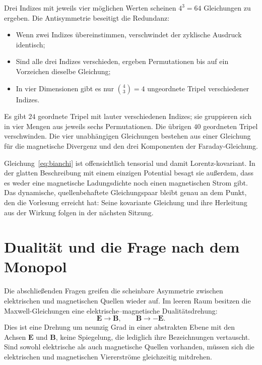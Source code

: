 Drei Indizes mit jeweils vier möglichen Werten scheinen \(4^3=64\) Gleichungen zu ergeben. Die Antisymmetrie beseitigt die Redundanz:
\begin{itemize}
\item Wenn zwei Indizes übereinstimmen, verschwindet der zyklische Ausdruck identisch;
\item Sind alle drei Indizes verschieden, ergeben Permutationen bis auf ein Vorzeichen dieselbe Gleichung;
\item In vier Dimensionen gibt es nur \(\binom{4}{3}=4\) ungeordnete Tripel verschiedener Indizes.
\end{itemize}
Es gibt \(24\) geordnete Tripel mit lauter verschiedenen Indizes; sie gruppieren sich in vier Mengen aus jeweils sechs Permutationen. Die übrigen \(40\) geordneten Tripel verschwinden. Die vier unabhängigen Gleichungen bestehen aus einer Gleichung für die magnetische Divergenz und den drei Komponenten der Faraday-Gleichung.

\begin{classroomqa}
\end{classroomqa}

Gleichung~\eqref{eq:bianchi} ist offensichtlich tensorial und damit Lorentz-kovariant. In der glatten Beschreibung mit einem einzigen Potential besagt sie außerdem, dass es weder eine magnetische Ladungsdichte noch einen magnetischen Strom gibt. Das dynamische, quellenbehaftete Gleichungspaar bleibt genau an dem Punkt, den die Vorlesung erreicht hat: Seine kovariante Gleichung und ihre Herleitung aus der Wirkung folgen in der nächsten Sitzung.

\section{Dualität und die Frage nach dem Monopol}

Die abschließenden Fragen greifen die scheinbare Asymmetrie zwischen elektrischen und magnetischen Quellen wieder auf. Im leeren Raum besitzen die Maxwell-Gleichungen eine elektrische--magnetische Dualitätsdrehung:
\begin{equation}
\mathbf E\longrightarrow\mathbf B,
\qquad
\mathbf B\longrightarrow-\mathbf E.
\label{eq:duality-quarter-turn}
\end{equation}
Dies ist eine Drehung um neunzig Grad in einer abstrakten Ebene mit den Achsen \(\mathbf E\) und \(\mathbf B\), keine Spiegelung, die lediglich ihre Bezeichnungen vertauscht. Sind sowohl elektrische als auch magnetische Quellen vorhanden, müssen sich die elektrischen und magnetischen Viererströme gleichzeitig mitdrehen.

